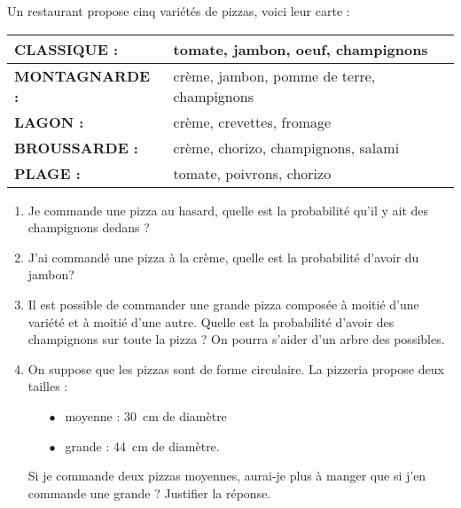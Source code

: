 
\bigskip
 
Un restaurant propose cinq variétés de pizzas, voici leur carte :

\begin{center}
\renewcommand\arraystretch{1.9}
\begin{tabularx}{0.75\linewidth}{|p{3cm}X|}\hline 
\textbf{CLASSIQUE :}& tomate, jambon, oeuf, champignons\\ \hline 
\textbf{MONTAGNARDE :}& crème, jambon, pomme de terre, champignons\\ \hline 
\textbf{LAGON :}& crème, crevettes, fromage\\ \hline 
\textbf{BROUSSARDE :}& crème, chorizo, champignons, salami\\ \hline 
\textbf{PLAGE :}& tomate, poivrons, chorizo\\ \hline
\end{tabularx}
\renewcommand\arraystretch{1.9}
\end{center}
 
\begin{enumerate}
\item Je commande une pizza au hasard, quelle est la probabilité qu'il y ait des champignons dedans ? 
\item J'ai commandé une pizza à la crème, quelle est la probabilité d'avoir du jambon? 
\item Il est possible de commander une grande pizza composée à moitié d'une variété et à moitié d'une autre. Quelle est la probabilité d'avoir des champignons sur toute la pizza ? On pourra s'aider d'un arbre des possibles. 
\item On suppose que les pizzas sont de forme circulaire. La pizzeria propose deux tailles :

\setlength\parindent{8mm} 
\begin{itemize}
\item[$\bullet~~$] moyenne : 30~cm de diamètre 
\item[$\bullet~~$] grande  : 44~cm de diamètre.
\end{itemize}
\setlength\parindent{0mm} 
 
Si je commande deux pizzas moyennes, aurai-je plus à manger que si j'en commande une grande ? Justifier la réponse. 
\end{enumerate}

\bigskip

